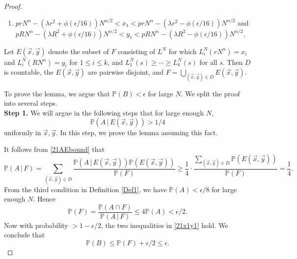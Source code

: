 \begin{proof}
\begin{enumerate}[label=(\arabic*)]
			\item $prN^\alpha - (\lambda r^2+\phi(\epsilon/16))N^{\alpha/2} < x_1 <  prN^\alpha - (\lambda r^2-\phi(\epsilon/16))N^{\alpha/2}$ and $pRN^\alpha - (\lambda R^2+\phi(\epsilon/16))N^{\alpha/2} < y_1 <  pRN^\alpha - (\lambda R^2-\phi(\epsilon/16))N^{\alpha/2}$.
			
		\end{enumerate}
		Let $E(\vec{x},\vec{y})$ denote the subset of $F$ consisting of $L^N$ for which $L_i^N(rN^\alpha) = x_i$ and $L_i^N(RN^\alpha)=y_i$ for $1\leq i\leq k$, and $L_1^N(s) \geq \cdots \geq L_k^N(s)$ for all $s$. Then $D$ is countable, the $E(\vec{x},\vec{y})$ are pairwise disjoint, and $F = \bigcup_{(\vec{x},\vec{y})\in D} E(\vec{x},\vec{y})$.
		
		To prove the lemma, we argue that $\mathbb{P}(B) < \epsilon$ for large $N$. We split the proof into several steps.\\
		
		\noindent\textbf{Step 1.} We will argue in the following steps that for large enough $N$,
		\begin{equation}\label{21AEbound}
		\mathbb{P}(A\,|\, E(\vec{x},\vec{y})) > 1/4
		\end{equation}
		uniformly in $\vec{x},\vec{y}$. In this step, we prove the lemma assuming this fact. 
		
		It follows from \eqref{21AEbound} that
		\begin{equation}
		\mathbb{P}(A\,|\,F) = \sum_{(\vec{x},\vec{y})\in D} \frac{\mathbb{P}(A\,|\,E(\vec{x},\vec{y}))\mathbb{P}(E(\vec{x},\vec{y}))}{\mathbb{P}(F)} \geq \frac{1}{4}\cdot\frac{\sum_{(\vec{x},\vec{y})\in D} \mathbb{P}(E(\vec{x},\vec{y}))}{\mathbb{P}(F)} = \frac{1}{4}.
		\end{equation}
		From the third condition in Definition \ref{Def1}, we have $\mathbb{P}(A) < \epsilon/8$ for large enough $N$. Hence
		\[
		\mathbb{P}(F) = \frac{\mathbb{P}(A\cap F)}{\mathbb{P}(A\,|\,F)} \leq 4\mathbb{P}(A) < \epsilon/2.
		\]
		Now with probability $>1-\epsilon/2$, the two inequalities in \eqref{21x1y1} hold. We conclude that
		\[
		\mathbb{P}(B) \leq \mathbb{P}(F) + \epsilon/2 \leq \epsilon.
		\]
		

\end{proof}
